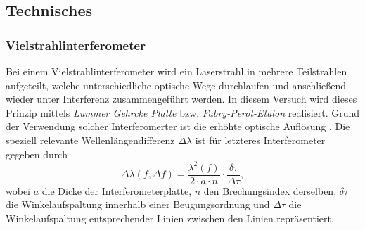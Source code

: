 \documentclass[../main.tex]{subfiles}
\begin{document}
    \subsection{Technisches}
        \subsubsection*{Vielstrahlinterferometer}
            Bei einem Vielstrahlinterferometer wird ein Laserstrahl in mehrere Teilstrahlen aufgeteilt, welche unterschiedliche optische Wege durchlaufen und anschließend wieder unter Interferenz zusammengeführt werden. In diesem Versuch wird dieses Prinzip mittels \emph{Lummer Gehrcke Platte} bzw. \emph{Fabry-Perot-Etalon} realisiert. Grund der Verwendung solcher Interferomerter ist die erhöhte optische Auflösung \cite[p.703f]{skript}. Die speziell relevante Wellenlängendifferenz $\Delta\lambda$ ist für letzteres Interferometer gegeben durch
            \[
                \Delta\lambda(f,\Delta f)=\frac{\lambda^2(f)}{2\cdot a\cdot n}\cdot\frac{\delta\tau}{\Delta\tau},
            \]
            wobei $a$ die Dicke der Interferometerplatte, $n$ den Brechungsindex derselben, $\delta\tau$ die Winkelaufspaltung innerhalb einer Beugungsordnung und $\Delta\tau$ die Winkelaufspaltung entsprechender Linien zwischen den Linien repräsentiert. 
\end{document}
